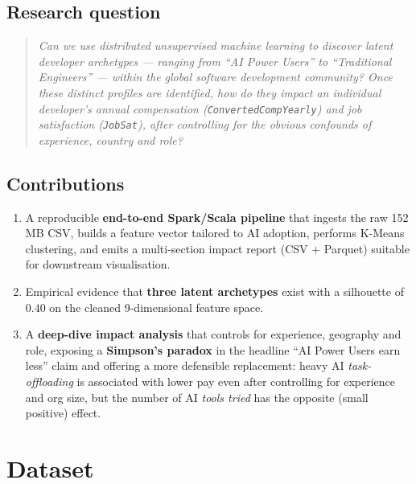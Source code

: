 \documentclass[11pt,a4paper]{article}
\begin{document}
\subsection{Research question}

\begin{quote}\itshape
  Can we use distributed unsupervised machine learning to discover latent
  developer archetypes --- ranging from ``AI Power Users'' to ``Traditional
  Engineers'' --- within the global software development community? Once
  these distinct profiles are identified, how do they impact an individual
  developer's annual compensation (\texttt{ConvertedCompYearly}) and job
  satisfaction (\texttt{JobSat}), after controlling for the obvious
  confounds of experience, country and role?
\end{quote}

\subsection{Contributions}

\begin{enumerate}[leftmargin=2em]
  \item A reproducible \textbf{end-to-end Spark/Scala pipeline} that
        ingests the raw 152\,MB CSV, builds a feature vector tailored to
        AI adoption, performs K-Means clustering, and emits a
        multi-section impact report (CSV $+$ Parquet) suitable for
        downstream visualisation.
  \item Empirical evidence that \textbf{three latent archetypes} exist with
        a silhouette of $0.40$ on the cleaned 9-dimensional feature space.
  \item A \textbf{deep-dive impact analysis} that controls for experience,
        geography and role, exposing a \textbf{Simpson's paradox} in the
        headline ``AI Power Users earn less'' claim and offering a more
        defensible replacement: heavy AI \emph{task-offloading} is
        associated with lower pay even after controlling for experience
        and org size, but the number of AI \emph{tools tried} has the
        opposite (small positive) effect.
\end{enumerate}

\section{Dataset}
\end{document}
